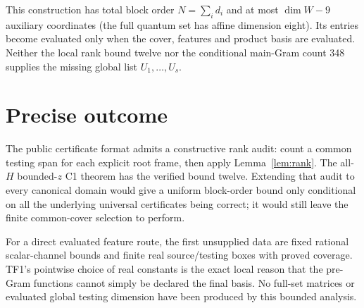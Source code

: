 \documentclass[11pt]{article}
\begin{document}
This construction has total block order $N=\sum_i d_i$ and at
most $\dim W-9$ auxiliary coordinates (the full quantum set has
affine dimension eight). Its entries become evaluated only when
the cover, features and product basis are evaluated. Neither the
local rank bound twelve nor the conditional main-Gram count 348
supplies the missing global list $U_1,\ldots,U_s$.

\section{Precise outcome}

The public certificate format admits a constructive rank audit:
count a common testing span for each explicit root frame, then
apply Lemma~\ref{lem:rank}. The all-$H$ bounded-$z$ C1 theorem
has the verified bound twelve. Extending that audit to every
canonical domain would give a uniform block-order bound only
conditional on all the underlying universal certificates being
correct; it would still leave the finite common-cover selection
to perform.

For a direct evaluated feature route, the first unsupplied data
are fixed rational scalar-channel bounds and finite real
source/testing boxes with proved coverage. TF1's pointwise
choice of real constants is the exact local reason that the
pre-Gram functions cannot simply be declared the final basis.
No full-set matrices or evaluated global testing dimension have
been produced by this bounded analysis.
\end{document}
